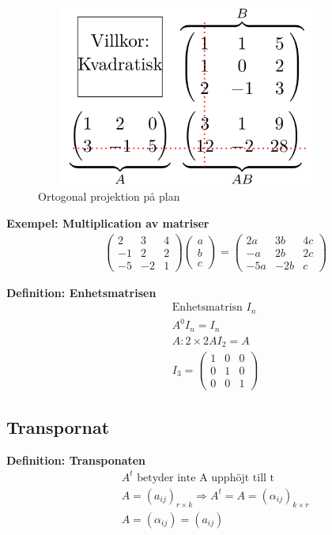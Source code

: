 \begin{figure}[h]
    \vspace{10mm}
    \centering
    \includegraphics[width=10cm, height=6cm]{image/matris-multiplikation.png} 
    \caption{Ortogonal projektion på plan}
\end{figure}

\textbf{Exempel: Multiplication av matriser}
\begin{align*}
  &\quad
  \left(\begin{array}{ccc}
    2  & 3  & 4 \\
    -1 & 2  & 2 \\
    -5 & -2 & 1 
  \end{array}\right)
  \left(\begin{array}{c}
    a \\
    b \\
    c 
  \end{array}\right) =
  \left(\begin{array}{ccc}
    2a  & 3b  & 4c \\
    -a & 2b  & 2c \\
    -5a & -2b & c 
  \end{array}\right)
\end{align*}

\textbf{Definition: Enhetsmatrisen}
\begin{align*}
  &\quad  \text{Enhetsmatrisn } I_n \\
  &\quad  A^0I_n = I_n \\
  &\quad  A: 2\times{2} AI_2 = A \\
  &\quad  I_3 =
  \left(\begin{array}{ccc}
    1 & 0 & 0 \\
    0 & 1 & 0 \\
    0 & 0 & 1 
  \end{array}\right)
\end{align*}


\subsection{Transpornat}
\textbf{Definition: Transponaten}
\begin{align*}
  &\quad  A^t \text{ betyder inte A upphöjt till t} \\
  &\quad  A={(a_{ij})}_{r\times{k}} \Rightarrow A^t=A={(\alpha_{ij})}_{k\times{r}} \\
  &\quad  A={(\alpha_{ij})}={(a_{ij})}  \\
\end{align*}

